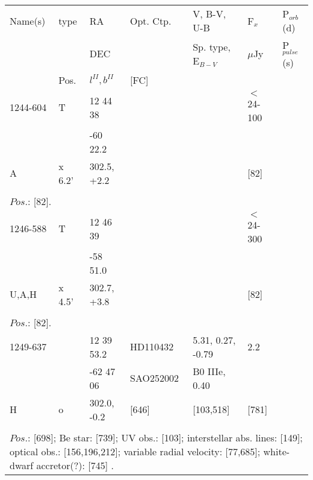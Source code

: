 \documentclass{aa}
\begin{document}
\clearpage\begin{table*}[h]
\begin{tabular}{p{2.5cm}p{1cm}p{1.8cm}p{2.3cm}p{3.3cm}p{2.0cm}p{2.2cm}}
\noalign{\smallskip}
\multicolumn{7}{p{17.5cm}}{Table 1.  (continued) }\\        
\hline
\noalign{\smallskip}
Name(s)      & type  & RA                       &  Opt. Ctp. & V, B-V, U-B                    &   F$_{x}$           & P$_{orb}$(d)    \\
                      &            &  DEC                   &                     & Sp. type, E$_{B-V}$   &    $\mu$Jy        & P$_{pulse}$(s) \\
                      & Pos.  &  $l^{II}, b^{II}$     &  [FC]           &                                          &                            &                             \\
\noalign{\smallskip} 

\hline
\noalign{\smallskip}
 1244-604   &   T       & 12 44 38           &                    &             & $<$24-100    &             \\
                     &            & -60 22.2             &                    &             &                        &            \\
A                  & x 6.2'  & 302.5, +2.2       &                    &              &  [82]            &             \\
\\
\multicolumn{7}{p{17.5cm}}{
$Pos$.: [82].}\\

\noalign{\smallskip}
\hline
\noalign{\smallskip}
 1246-588   &   T       & 12 46 39           &                    &              & $<$24-300     &                 \\
                     &             & -58 51.0            &                    &              &                         &                 \\
U,A,H          & x 4.5'  & 302.7, +3.8       &                    &              &  [82]              &                 \\
\\
\multicolumn{7}{p{17.5cm}}{
$Pos$.: [82].}\\

\noalign{\smallskip}
\hline 
\noalign{\smallskip}
1249-637   &          & 12 39 53.2      & HD110432           & 5.31, 0.27, -0.79        &    2.2             &                              \\
                    &          & -62 47 06        &  SAO252002       &  B0 IIIe, 0.40              &                      &                   \\
    H             & o      & 302.0, -0.2       &      [646]              &  [103,518]                   & [781]          &                         \\
\\
\multicolumn{7}{p{17.5cm}}{
$Pos$.: [698]; Be star: [739]; UV obs.: [103]; interstellar abs. lines: [149]; optical obs.: [156,196,212]; variable 
radial velocity: [77,685]; white-dwarf accretor(?): [745] .}\\


\end{tabular}
\end{table*}
\end{document}
